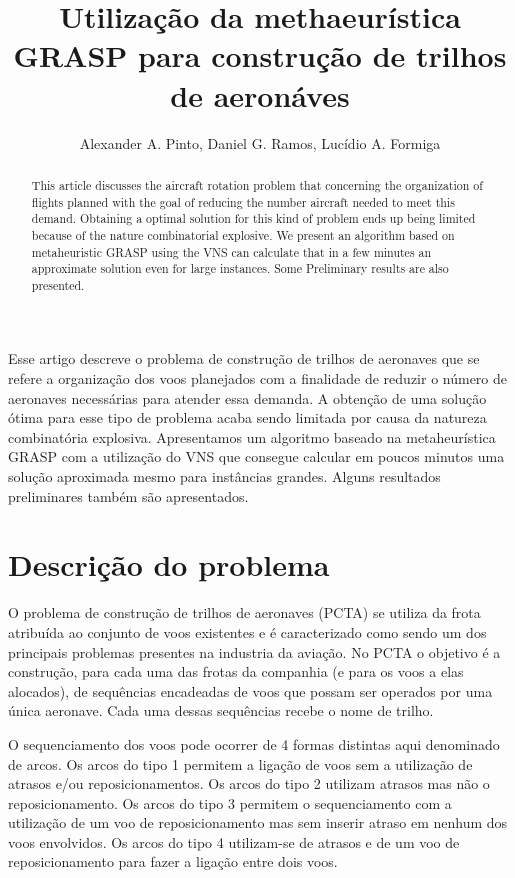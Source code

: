 \documentclass[12pt]{article}
\title{Utilização da methaeurística GRASP para construção de trilhos de aeronáves}
\author{Alexander A. Pinto\inst{1}, Daniel G. Ramos\inst{1}, Lucídio A. Formiga\inst{1}}
\begin{document}
 

\maketitle

\begin{abstract}
  This article discusses the aircraft rotation problem that
concerning the organization of flights planned with the goal of reducing the number
aircraft needed to meet this demand. Obtaining a optimal solution
for this kind of problem ends up being limited because of the nature
combinatorial explosive. We present an algorithm based on metaheuristic
GRASP using the VNS can calculate that in a few
minutes an approximate solution even for large instances. Some
Preliminary results are also presented.
\end{abstract}
     
\begin{resumo} 
Esse artigo descreve o problema de construção de trilhos de aeronaves que se 
refere a organização dos voos planejados com a finalidade de reduzir o número
de aeronaves necessárias para atender essa demanda. A obtenção de uma solução
ótima para esse tipo de problema acaba sendo limitada por causa da natureza 
combinatória explosiva. Apresentamos um algoritmo baseado na metaheurística 
GRASP com a utilização do VNS que consegue calcular em poucos 
minutos uma solução aproximada mesmo para instâncias grandes. Alguns 
resultados preliminares também são apresentados.
\end{resumo}


\section{Descrição do problema}

O problema de construção de trilhos de aeronaves (PCTA) se utiliza da frota atribuída ao conjunto de voos existentes e é caracterizado como sendo um dos principais problemas presentes na industria da aviação. No PCTA o objetivo é a construção, para cada uma das frotas da companhia (e para os voos a elas alocados), de sequências encadeadas de voos que possam ser operados por uma única aeronave\cite{abiliolivro}. Cada uma dessas sequências recebe o nome de trilho.

O sequenciamento dos voos pode ocorrer de 4 formas distintas aqui denominado de arcos. Os arcos do tipo 1 permitem a ligação de voos sem a utilização de atrasos e/ou reposicionamentos. Os arcos do tipo 2 utilizam atrasos mas não o reposicionamento. Os arcos do tipo 3 permitem o sequenciamento com a utilização de um voo de reposicionamento mas sem inserir atraso em nenhum dos voos envolvidos. Os arcos do tipo 4 utilizam-se de atrasos e de um voo de reposicionamento para fazer a ligação entre dois voos.
\end{document}
